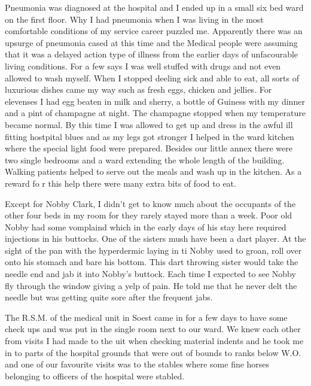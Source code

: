 Pneumonia was diagnosed at the hospital and I ended up in a small six
bed ward on the first floor. Why I had pneumonia when I was living in
the most comfortable conditions of my service career puzzled
me. Apparently there was an upsurge of pneumonia cased at this time
and the Medical people were assuming that it was a delayed action type
of illness from the earlier days of unfacourable living
conditions. For a few says I was well stuffed with drugs and not even
allowed to wash myself. When I stopped deeling sick and able to eat,
all sorts of luxurious dishes came my way such as fresh eggs, chicken
and jellies. For elevenses I had egg beaten in milk and sherry, a
bottle of Guiness with my dinner and a pint of champagne at night. The
champagne stopped when my temperature became normal. By this time I
was allowed to get up and dress in the awful ill fitting hostpital
blues and as my legs got stronger I helped in the ward kitchen where
the special light food were prepared. Besides our little annex there
were two single bedrooms and a ward extending the whole length of the
building. Walking patients helped to serve out the meals and wash up
in the kitchen. As a reward fo r this help there were many extra bits
of food to eat.

Except for Nobby Clark, I didn't get to know much about the occupants
of the other four beds in my room for they rarely stayed more than a
week. Poor old Nobby had some vomplaind which in the early days of his
stay here required injections in his buttocks. One of the sisters mush
have been a dart player. At the sight of the pan with the hyperdermic
laying in ti Nobby used to groan, roll over onto his stomach and bare
his bottom. This dart throwing sister would take the needle end and
jab it into Nobby's buttock. Each time I expected to see Nobby fly
through the window giving a yelp of pain. He told me that he never
delt the needle but was getting quite sore after the frequent jabs.

The R.S.M. of the medical unit in Soest came in for a few days to have
some check ups and was put in the single room next to our ward. We
knew each other from visits I had made to the uit when checking
material indents and he took me in to parts of the hospital grounds
that were out of bounds to ranks below W.O. and one of our favourite
visits was to the stables where some fine horses belonging to officers
of the hospital were stabled.

